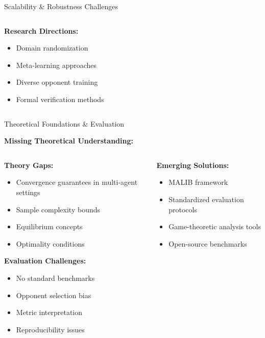 \documentclass[aspectratio=169]{beamer}
\begin{document}
\begin{frame}{Scalability \& Robustness Challenges}
\begin{columns}
\begin{column}{0.5\textwidth}
            \vfill
            \textbf{Research Directions:}
            \begin{itemize}
                \item Domain randomization
                \item Meta-learning approaches
                \item Diverse opponent training
                \item Formal verification methods
            \end{itemize}
        \end{column}
    \end{columns}
\end{frame}

\begin{frame}{Theoretical Foundations \& Evaluation}
    
    \textbf{Missing Theoretical Understanding:} \autocite{fish_algorithmic_2025}
    
    \vfill
    
    \begin{columns}
        \begin{column}{0.6\textwidth}
            \textbf{Theory Gaps:}
            \begin{itemize}
                \item Convergence guarantees in multi-agent settings
                \item Sample complexity bounds
                \item Equilibrium concepts
                \item Optimality conditions
            \end{itemize}
            
            \vfill
            \textbf{Evaluation Challenges:}
            \begin{itemize}
                \item No standard benchmarks
                \item Opponent selection bias
                \item Metric interpretation
                \item Reproducibility issues
            \end{itemize}
        \end{column}
        \begin{column}{0.4\textwidth}
            \textbf{Emerging Solutions:}
            \begin{itemize}
                \item MALIB framework \autocite{zhou_malib_2023}
                \item Standardized evaluation protocols
                \item Game-theoretic analysis tools
                \item Open-source benchmarks
            \end{itemize}
            

\end{column}
\end{columns}
\end{frame}
\end{document}
